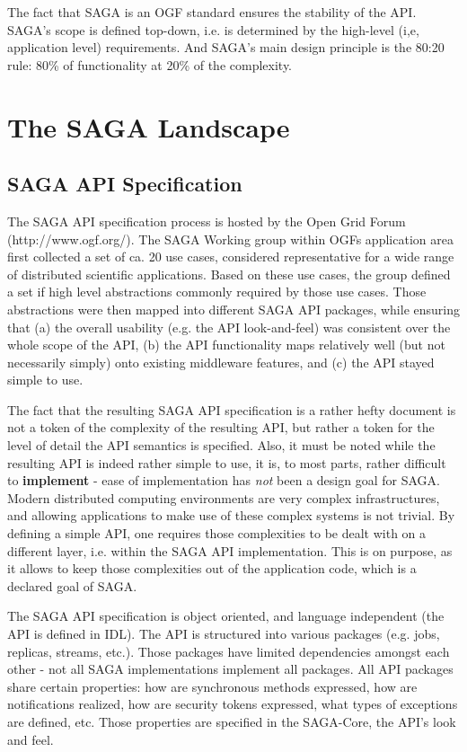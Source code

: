 \documentclass[12pt]{article}
\begin{document}
 The fact that SAGA is an OGF standard ensures the stability of the
 API.   SAGA's scope is defined top-down, i.e. is determined by the
 high-level (i,e, application level) requirements.  And SAGA's main
 design principle is the 80:20 rule: 80\% of functionality at 20\% of
 the complexity.


\section{The SAGA Landscape}

 \subsection{SAGA API Specification}

  The SAGA API specification process is hosted by the Open Grid Forum
  (http://www.ogf.org/).  The SAGA Working group within OGFs
  application area first collected a set of ca. 20 use cases,
  considered representative for a wide range of distributed scientific
  applications.  Based on these use cases, the group defined a set if
  high level abstractions commonly required by those use cases.  Those
  abstractions were then mapped into different SAGA API packages,
  while ensuring that (a) the overall usability (e.g. the API
  look-and-feel) was consistent over the whole scope of the API, (b)
  the API functionality maps relatively well (but not necessarily
  simply) onto existing middleware features, and (c) the API stayed
  simple to use.

  The fact that the resulting SAGA API specification is a rather hefty
  document is not a token of the complexity of the resulting API, but
  rather a token for the level of detail the API semantics is
  specified.  Also, it must be noted while the resulting API is indeed
  rather simple to use, it is, to most parts, rather difficult to {\bf
  implement} - ease of implementation has {\it not} been a design goal
  for SAGA.  Modern distributed computing environments are very
  complex infrastructures, and allowing applications to make use of
  these complex systems is not trivial.  By defining a simple API, one
  requires those complexities to be dealt with on a different layer,
  i.e. within the SAGA API implementation. This is on purpose, as it
  allows to keep those complexities out of the application code, which
  is a declared goal of SAGA.

  The SAGA API specification is object oriented, and language
  independent (the API is defined in IDL).  The API is structured into
  various packages (e.g. jobs, replicas, streams, etc.).  Those
  packages have limited dependencies amongst each other - not all SAGA
  implementations implement all packages.  All API packages share
  certain properties: how are synchronous methods expressed, how are
  notifications realized, how are security tokens expressed, what
  types of exceptions are defined, etc.  Those properties are
  specified in the SAGA-Core, the API's look and feel.  
\end{document}
